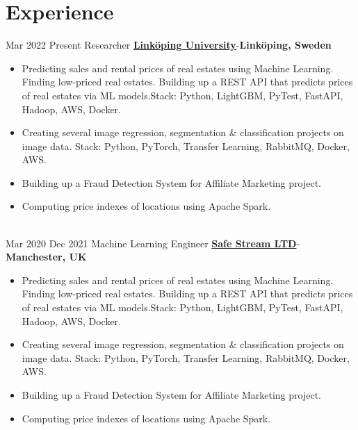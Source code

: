 \documentclass[letterpaper]{DS_class_file} %
\begin{document}
\makeprofile %




\section{Experience}

\begin{twenty}
    \twentyitem
		{Mar 2022}
		{Present}
		{\hspace{0.3cm}Researcher}
		{\href{https://liu.se/}{\textbf{Linköping University}}-\textbf{Linköping, Sweden}}
		{}
		{\begin{itemize}
                \item Predicting sales and rental prices of real estates using Machine Learning. Finding low-priced real estates. Building up a REST API that predicts prices of real estates via ML models.\newline Stack: Python, LightGBM, PyTest, FastAPI, Hadoop, AWS, Docker.
			\item Creating several image regression, segmentation \& classification projects on image data. \newline Stack: Python, PyTorch, Transfer Learning, RabbitMQ, Docker, AWS.
                \item Building up a Fraud Detection System for Affiliate Marketing project.
                \item Computing price indexes of locations using Apache Spark.
			
                
		\end{itemize}}
		\\
    \twentyitem
		{Mar 2020}
		{Dec 2021}
		{\hspace{0.3cm}Machine Learning Engineer}
		{\href{https://www.linkedin.com/company/safe-stream/about/}{\textbf{Safe Stream LTD}}-\textbf{Manchester, UK}}
		{}
		{\begin{itemize}
                \item Predicting sales and rental prices of real estates using Machine Learning. Finding low-priced real estates. Building up a REST API that predicts prices of real estates via ML models.\newline Stack: Python, LightGBM, PyTest, FastAPI, Hadoop, AWS, Docker.
			\item Creating several image regression, segmentation \& classification projects on image data. \newline Stack: Python, PyTorch, Transfer Learning, RabbitMQ, Docker, AWS.
                \item Building up a Fraud Detection System for Affiliate Marketing project.
                \item Computing price indexes of locations using Apache Spark.
			

\end{itemize}}
\end{twenty}
\end{document}
